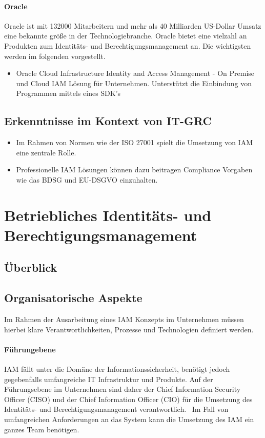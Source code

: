\documentclass[11pt]{article}
\begin{document}
\paragraph{Oracle}
Oracle ist mit 132000 Mitarbeitern und mehr als 40 Milliarden US-Dollar Umsatz eine bekannte größe in der Technologiebranche. Oracle bietet eine vielzahl an Produkten zum Identitäts- und Berechtigungsmanagement an. Die wichtigsten werden im folgenden vorgestellt.
\begin{itemize}
  \item Oracle Cloud Infrastructure Identity and Access Management - On Premise und Cloud IAM Lösung für Unternehmen. Unterstützt die Einbindung von Programmen mittels eines SDK's
\end{itemize}
\subsection{Erkenntnisse im Kontext von IT-GRC}
\begin{itemize}
  \item Im Rahmen von Normen wie der ISO 27001 spielt die Umsetzung von IAM eine zentrale Rolle.
  \item Professionelle IAM Lösungen können dazu beitragen Compliance Vorgaben wie das BDSG und EU-DSGVO einzuhalten.
\end{itemize}
\section{Betriebliches Identitäts- und Berechtigungsmanagement}
\label{sec:betrieb}
\subsection{Überblick}
\subsection{Organisatorische Aspekte}
Im Rahmen der Ausarbeitung eines IAM Konzepts im Unternehmen müssen hierbei klare Verantwortlichkeiten, Prozesse und Technologien definiert werden.
\paragraph{Führungebene}
IAM fällt unter die Domäne der Informationssicherheit, benötigt jedoch gegebenfalls umfangreiche IT Infrastruktur und Produkte. Auf der Führungsebene im Unternehmen sind daher der Chief Information Security Officer (CISO) und der Chief Information Officer (CIO) für die Umsetzung des Identitäts- und Berechtigungsmanagement verantwortlich.~\cite{azhar2014economics}\cite{baldwin2009using} Im Fall von umfangreichen Anforderungen an das System kann die Umsetzung des IAM ein ganzes Team benötigen.~\cite{mohammed2011identity}
\end{document}

